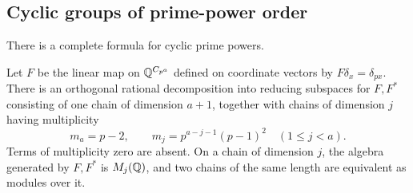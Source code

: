 \subsection{Cyclic groups of prime-power order}

There is a complete formula for cyclic prime powers.

\begin{lemma}
\label{lem:tree-chain-decomposition}
Let \(F\) be the linear map on \(\mathbb Q^{C_{p^a}}\) defined on coordinate
vectors by \(F\delta_x=\delta_{px}\).  There is an orthogonal rational
decomposition into reducing subspaces for \(F,F^*\) consisting of one chain
of dimension \(a+1\), together with chains of dimension \(j\) having
multiplicity
\[
 m_a=p-2,\qquad
 m_j=p^{a-j-1}(p-1)^2\quad(1\leq j<a).
 \tag{C}\label{eq:tree-chain-multiplicities}
\]
Terms of multiplicity zero are absent.  On a chain of dimension \(j\), the
algebra generated by \(F,F^*\) is \(M_j(\mathbb Q)\), and two chains of the same
length are equivalent as modules over it.
\end{lemma}


